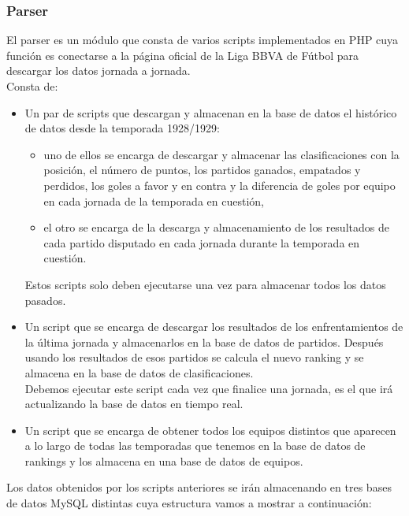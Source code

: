 \subsubsection{Parser}
El parser es un módulo que consta de varios scripts implementados en PHP cuya función es conectarse a la página oficial de la Liga BBVA de Fútbol para descargar los datos jornada a jornada.\\

Consta de:
\begin{itemize}
	\item Un par de scripts que descargan y almacenan en la base de datos el histórico de datos desde la temporada 1928/1929: 
	\begin{itemize}
		\item uno de ellos se encarga de descargar y almacenar las clasificaciones con la posición, el número de puntos, los partidos ganados, empatados y perdidos, los goles a favor y en contra y la diferencia de goles por equipo en cada jornada de la temporada en cuestión,
		\item el otro se encarga de la descarga y almacenamiento de los resultados de cada partido disputado en cada jornada durante la temporada en cuestión. 
	\end{itemize}
	Estos scripts solo deben ejecutarse una vez para almacenar todos los datos pasados.
	\item Un script que se encarga de descargar los resultados de los enfrentamientos de la última jornada y almacenarlos en la base de datos de partidos. Después usando los resultados de esos partidos se calcula el nuevo ranking y se almacena en la base de datos de clasificaciones.\\
	Debemos ejecutar este script cada vez que finalice una jornada, es el que irá actualizando la base de datos en tiempo real.
	\item Un script que se encarga de obtener todos los equipos distintos que aparecen a lo largo de todas las temporadas que tenemos en la base de datos de rankings y los almacena en una base de datos de equipos.
\end{itemize}

\newpage

Los datos obtenidos por los scripts anteriores se irán almacenando en tres bases de datos MySQL distintas cuya estructura vamos a mostrar a continuación: 


